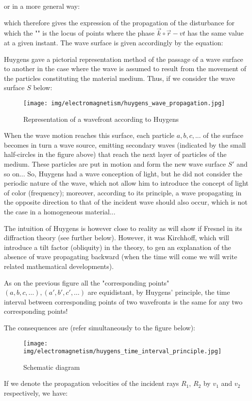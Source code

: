 	or in a more general way:
	
	which therefore gives the expression of the propagation of the disturbance for which the "" is the locus of points where the phase $\vec{k}\circ\vec{r}-vt$ has the same value at a given instant. The wave surface is given accordingly by the equation:
	
	Huygens gave a pictorial representation method of the passage of a wave surface to another in the case where the wave is assumed to result from the movement of the particles constituting the material medium. Thus, if we consider the wave surface $S$ below:
	\begin{figure}[H]
		\centering
		\texttt{[image: img/electromagnetism/huygens\_wave\_propagation.jpg]}
		\caption{Representation of a wavefront according to Huygens}
	\end{figure}
	When the wave motion reaches this surface, each particle $a, b, c, ...$ of the surface becomes in turn a wave source, emitting secondary waves (indicated by the small half-circles in the figure above) that reach the next layer of particles of the medium. These particles are put in motion and form the new wave surface $S'$ and so on... So, Huygens had a wave conception of light, but he did not consider the periodic nature of the wave, which not allow him to introduce the concept of light of color (frequency); moreover, according to its principle, a wave propagating in the opposite direction to that of the incident wave should also occur, which is not the case in a homogeneous material...
	
	The intuition of Huygens is however close to reality as will show if Fresnel in its diffraction theory (see further below). However, it was Kirchhoff, which will introduce a tilt factor (obliquity) in the theory, to gen an explanation of the absence of wave propagating backward (when the time will come we will write related mathematical developments).
	
	As on the previous figure all the "corresponding points" $(a,b,c,\ldots),(a',b',c',\ldots)$ are  equidistant, by Huygens' principle, the time interval between corresponding points of two wavefronts is the same for any two corresponding points!
	
	The consequences are (refer simultaneously to the figure below):
	\begin{figure}[H]
		\centering
		\texttt{[image: img/electromagnetism/huygens\_time\_interval\_principle.jpg]}
		\caption[]{Schematic diagram}
	\end{figure}
	If we denote the propagation velocities of the incident rays $R_1$, $R_2$ by $v_1$ and $v_2$ respectively, we have:
	

